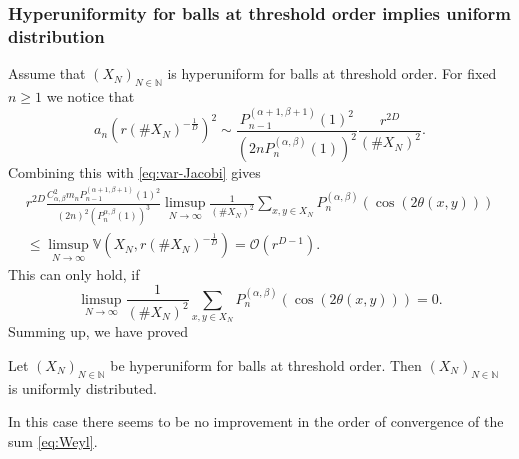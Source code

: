 \subsubsection{Hyperuniformity for balls at threshold order implies
  uniform distribution}\label{sec:hyper-balls-threshold}
Assume that $(X_N)_{N\in\mathbb{N}}$ is hyperuniform for balls at threshold
order. For fixed $n\geq 1$ we notice that
\begin{equation*}
  a_n(r(\#X_N)^{-\frac1D})^2
  \sim
  \frac{P_{n-1}^{(\alpha+1,\beta+1)}(1)^2}{(2nP_n^{(\alpha,\beta)}(1))^2}
  \frac{r^{2D}}{(\#X_N)^2}.
\end{equation*}
Combining this with \eqref{eq:var-Jacobi} gives
\begin{multline*}
  r^{2D}\frac{C_{\alpha,\beta}^2m_nP_{n-1}^{(\alpha+1,\beta+1)}(1)^2}
  {(2n)^2(P_n^{\alpha,\beta}(1))^3}
  \limsup_{N\to\infty}\frac1{(\#X_N)^2}
  \sum_{x,y\in X_N}P_n^{(\alpha,\beta)}(\cos(2\theta(x,y)))\\
  \leq
  \limsup_{N\to\infty}\mathbb{V}(X_N,r(\#X_N)^{-\frac1D})=\mathcal{O}(r^{D-1}).
\end{multline*}
This can only hold, if
\begin{equation*}
  \limsup_{N\to\infty}\frac1{(\#X_N)^2}
  \sum_{x,y\in X_N}P_n^{(\alpha,\beta)}(\cos(2\theta(x,y)))=0.
\end{equation*}
Summing up, we have proved
\begin{theorem}
  Let $(X_N)_{N\in\mathbb{N}}$ be hyperuniform for balls at threshold
  order. Then $(X_N)_{N\in\mathbb{N}}$ is uniformly distributed.
\end{theorem}
\begin{remark}
  In this case there seems to be no improvement in the order of convergence of
  the sum \eqref{eq:Weyl}.
\end{remark}
